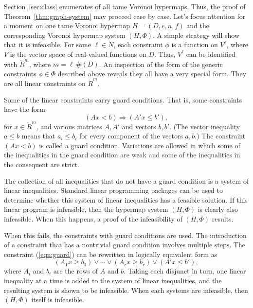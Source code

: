 \documentclass{article} %
\begin{document}
Section~\ref{sec:class} enumerates of all tame Voronoi
hypermaps.  Thus, the proof of
Theorem~\ref{thm:graph-system} may proceed case by case.
Let's focus attention for a moment on one tame Voronoi hypermap
$H=(D,e,n,f)$ and the corresponding Voronoi hypermap system
$(H,\Phi)$. A simple strategy will show that it is infeasible. For
some $\ell\in\ring{N}$, each constraint $\phi$ is a function on
$V^\ell$, where $V$ is the vector space of real-valued functions on
$D$. Thus, $V^\ell$ can be identified with $\ring{R}^m$, where $m=
\ell\, \#(D)$. An inspection of the form of the generic constraints
$\phi\in \Phi$ described above reveals they all have a very special
form. They are all linear constraints on $\ring{R}^m$.

Some of the linear constraints
carry guard conditions.  That is, some constraints have the form
  \begin{equation}\label{eqn:guard}
  (A x < b)  \Rightarrow (A' x \le b'),
  \end{equation}
for $x\in\ring{R}^m$, and various matrices $A,A'$ and vectors
$b,b'$.  (The vector inequality $a \le b$ means
that $a_i\le b_i$ for every component of the vectors $a,b$.)
The constraint $(A x < b)$ is called a guard condition.
Variations are allowed in which some of the inequalities in the
guard condition are weak and some of the inequalities in the
consequent are strict.

The collection of all inequalities that do not have a guard 
condition is a system of linear inequalities.  Standard linear
programming packages can be used to determine whether this
system of linear inequalities has a feasible solution.  If this
linear program is infeasible, then the hypermap system $(H,\Phi)$
is clearly also infeasible.  When this happens, a
proof of the infeasibility of $(H,\Phi)$ results.

When this fails, the constraints with guard conditions are
used.
The introduction of a constraint that has a nontrivial guard condition
involves multiple steps.  
The constraint (\ref{eqn:guard}) can be rewritten in logically
equivalent form as
  $$
   (A_{1} x \ge b_{1}) \lor \cdots \lor
   (A_{r} x \ge b_{r}) \lor (A' x \le b'),
  $$
where $A_{i}$ and $b_{i}$ are the rows of $A$ and $b$.
Taking each disjunct in turn, one linear inequality at a time
is added to the system
of linear inequalities, and the resulting system is shown to be
infeasible.  When each
systems are infeasible, then $(H,\Phi)$ itself is infeasible.

\end{document}
